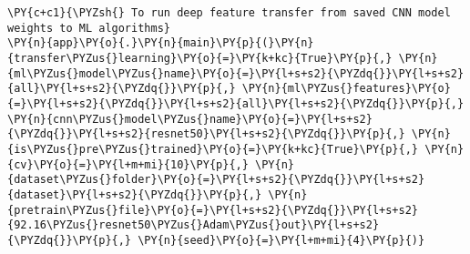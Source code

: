     \begin{tcolorbox}[breakable, size=fbox, boxrule=1pt, pad at break*=1mm,colback=cellbackground, colframe=cellborder]
\begin{Verbatim}[commandchars=\\\{\}]
\PY{c+c1}{\PYZsh{} To run deep feature transfer from saved CNN model weights to ML algorithms}
\PY{n}{app}\PY{o}{.}\PY{n}{main}\PY{p}{(}\PY{n}{transfer\PYZus{}learning}\PY{o}{=}\PY{k+kc}{True}\PY{p}{,} \PY{n}{ml\PYZus{}model\PYZus{}name}\PY{o}{=}\PY{l+s+s2}{\PYZdq{}}\PY{l+s+s2}{all}\PY{l+s+s2}{\PYZdq{}}\PY{p}{,} \PY{n}{ml\PYZus{}features}\PY{o}{=}\PY{l+s+s2}{\PYZdq{}}\PY{l+s+s2}{all}\PY{l+s+s2}{\PYZdq{}}\PY{p}{,} \PY{n}{cnn\PYZus{}model\PYZus{}name}\PY{o}{=}\PY{l+s+s2}{\PYZdq{}}\PY{l+s+s2}{resnet50}\PY{l+s+s2}{\PYZdq{}}\PY{p}{,} \PY{n}{is\PYZus{}pre\PYZus{}trained}\PY{o}{=}\PY{k+kc}{True}\PY{p}{,} \PY{n}{cv}\PY{o}{=}\PY{l+m+mi}{10}\PY{p}{,} \PY{n}{dataset\PYZus{}folder}\PY{o}{=}\PY{l+s+s2}{\PYZdq{}}\PY{l+s+s2}{dataset}\PY{l+s+s2}{\PYZdq{}}\PY{p}{,} \PY{n}{pretrain\PYZus{}file}\PY{o}{=}\PY{l+s+s2}{\PYZdq{}}\PY{l+s+s2}{92.16\PYZus{}resnet50\PYZus{}Adam\PYZus{}out}\PY{l+s+s2}{\PYZdq{}}\PY{p}{,} \PY{n}{seed}\PY{o}{=}\PY{l+m+mi}{4}\PY{p}{)}
\end{Verbatim}
\end{tcolorbox}